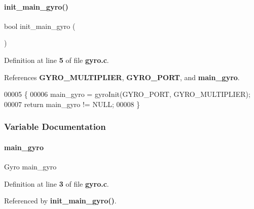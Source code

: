 \paragraph{init\+\_\+main\+\_\+gyro()}
{\footnotesize\ttfamily bool init\+\_\+main\+\_\+gyro (\begin{DoxyParamCaption}{ }\end{DoxyParamCaption})}



Definition at line \textbf{ 5} of file \textbf{ gyro.\+c}.



References \textbf{ G\+Y\+R\+O\+\_\+\+M\+U\+L\+T\+I\+P\+L\+I\+ER}, \textbf{ G\+Y\+R\+O\+\_\+\+P\+O\+RT}, and \textbf{ main\+\_\+gyro}.


\begin{DoxyCode}
00005                       \{
00006   main_gyro = gyroInit(GYRO_PORT, GYRO_MULTIPLIER);
00007   \textcolor{keywordflow}{return} main_gyro != NULL;
00008 \}
\end{DoxyCode}


\subsubsection{Variable Documentation}
\mbox{\label{a00098_ab848a00cddfc20556aef426cf11f9a85}} 
\paragraph{main\+\_\+gyro}
{\footnotesize\ttfamily Gyro main\+\_\+gyro\hspace{0.3cm}{\ttfamily [static]}}



Definition at line \textbf{ 3} of file \textbf{ gyro.\+c}.



Referenced by \textbf{ init\+\_\+main\+\_\+gyro()}.

